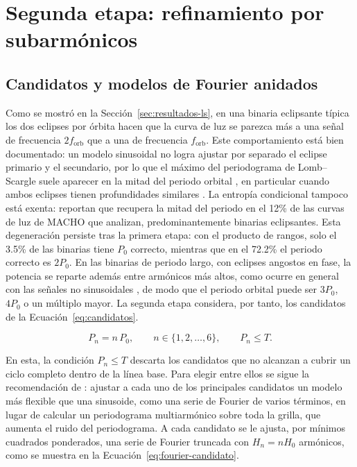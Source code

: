 \documentclass[12pt,letterpaper,oneside]{book}
\begin{document}
\section{Segunda etapa: refinamiento por subarm\'onicos}
\label{sec:hibrido-refinamiento}

\subsection{Candidatos y modelos de Fourier anidados}

Como se mostr\'o en la Secci\'on~\ref{sec:resultados-ls}, en una binaria eclipsante t\'ipica los dos eclipses por \'orbita hacen que la curva de luz se parezca m\'as a una se\~nal de frecuencia $2f_{\mathrm{orb}}$ que a una de frecuencia $f_{\mathrm{orb}}$. Este comportamiento est\'a bien documentado: un modelo sinusoidal no logra ajustar por separado el eclipse primario y el secundario, por lo que el m\'aximo del periodograma de Lomb--Scargle suele aparecer en la mitad del periodo orbital \citep{Graham2013,VanderPlas2018}, en particular cuando ambos eclipses tienen profundidades similares \citep{Coughlin2021}. La entrop\'ia condicional tampoco est\'a exenta: \citet{Graham2013b} reportan que recupera la mitad del periodo en el 12\% de las curvas de luz de MACHO que analizan, predominantemente binarias eclipsantes. Esta degeneraci\'on persiste tras la primera etapa: con el producto de rangos, solo el 3.5\% de las binarias tiene $P_0$ correcto, mientras que en el 72.2\% el periodo correcto es $2P_0$. En las binarias de periodo largo, con eclipses angostos en fase, la potencia se reparte adem\'as entre arm\'onicos m\'as altos, como ocurre en general con las se\~nales no sinusoidales \citep{VanderPlas2018}, de modo que el periodo orbital puede ser $3P_0$, $4P_0$ o un m\'ultiplo mayor. La segunda etapa considera, por tanto, los candidatos de la Ecuaci\'on~\eqref{eq:candidatos}.

\begin{equation}
	P_n = n\,P_0, \qquad n \in \{1, 2, \dots, 6\}, \qquad P_n \leq T.
	\label{eq:candidatos}
\end{equation}

En esta, la condici\'on $P_n\leq T$ descarta los candidatos que no alcanzan a cubrir un ciclo completo dentro de la l\'inea base. Para elegir entre ellos se sigue la recomendaci\'on de \citet{VanderPlas2018}: ajustar a cada uno de los principales candidatos un modelo m\'as flexible que una sinusoide, como una serie de Fourier de varios t\'erminos, en lugar de calcular un periodograma multiarm\'onico sobre toda la grilla, que aumenta el ruido del periodograma. A cada candidato se le ajusta, por m\'inimos cuadrados ponderados, una serie de Fourier truncada con $H_n=nH_0$ arm\'onicos, como se muestra en la Ecuaci\'on~\eqref{eq:fourier-candidato}.
\end{document}
